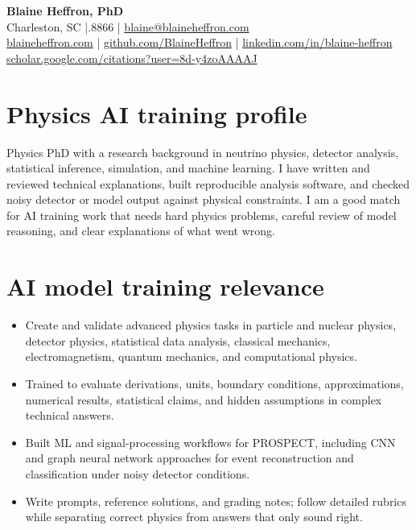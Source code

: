 \documentclass[10pt,letterpaper]{article}
\begin{document}
\begin{center}
  {\LARGE \textbf{Blaine Heffron, PhD}}\\
  Charleston, SC \;|.8866 \;|\; \href{mailto:blaine@blaineheffron.com}{blaine@blaineheffron.com}\\
  \href{https://blaineheffron.com}{blaineheffron.com} \;|\;
  \href{https://github.com/BlaineHeffron}{github.com/BlaineHeffron} \;|\;
  \href{https://www.linkedin.com/in/blaine-heffron}{linkedin.com/in/blaine-heffron}\\
  \href{https://scholar.google.com/citations?user=8d-y4zoAAAAJ}{scholar.google.com/citations?user=8d-y4zoAAAAJ}
\end{center}

\section*{Physics AI training profile}
Physics PhD with a research background in neutrino physics, detector analysis, statistical inference, simulation, and machine learning. I have written and reviewed technical explanations, built reproducible analysis software, and checked noisy detector or model output against physical constraints. I am a good match for AI training work that needs hard physics problems, careful review of model reasoning, and clear explanations of what went wrong.

\section*{AI model training relevance}
\begin{itemize}
  \item Create and validate advanced physics tasks in particle and nuclear physics, detector physics, statistical data analysis, classical mechanics, electromagnetism, quantum mechanics, and computational physics.
  \item Trained to evaluate derivations, units, boundary conditions, approximations, numerical results, statistical claims, and hidden assumptions in complex technical answers.
  \item Built ML and signal-processing workflows for PROSPECT, including CNN and graph neural network approaches for event reconstruction and classification under noisy detector conditions.
  \item Write prompts, reference solutions, and grading notes; follow detailed rubrics while separating correct physics from answers that only sound right.
\end{itemize}
\end{document}
